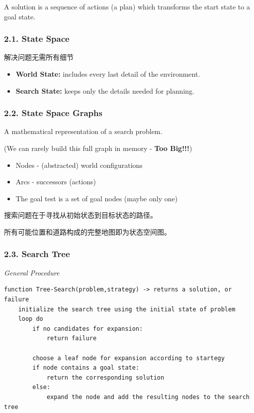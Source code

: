\documentclass[11pt,a4paper]{article}
\providecommand{\tightlist}{\setlength{\itemsep}{0pt}\setlength{\parskip}{0pt}}
\begin{document}
A solution is a sequence of actions (a plan) which transforms the start state to a goal state.

\subsubsection{2.1. State Space}\label{state-space}

解决问题无需所有细节

\begin{itemize}
\tightlist
\item
  \textbf{World State:} includes every last detail of the environment.
\item
  \textbf{Search State:} keeps only the details needed for planning.
\end{itemize}

\subsubsection{2.2. State Space Graphs}\label{state-space-graphs}

A mathematical representation of a search problem.

(We can rarely build this full graph in memory - \textbf{Too Big!!!})

\begin{itemize}
\tightlist
\item
  Nodes - (abstracted) world configurations
\item
  Arcs - successors (actions)
\item
  The goal test is a set of goal nodes (maybe only one)
\end{itemize}

搜索问题在于寻找从初始状态到目标状态的路径。

所有可能位置和道路构成的完整地图即为状态空间图。

\subsubsection{2.3. Search Tree}\label{search-tree}

\emph{General Procedure}

\begin{verbatim}
function Tree-Search(problem,strategy) -> returns a solution, or failure
    initialize the search tree using the initial state of problem
    loop do
        if no candidates for expansion:
            return failure
        
        choose a leaf node for expansion according to startegy
        if node contains a goal state:
            return the corresponding solution
        else:
            expand the node and add the resulting nodes to the search tree
\end{verbatim}
\end{document}
